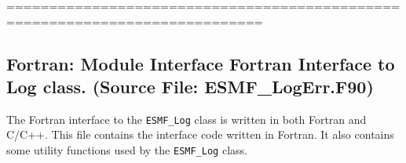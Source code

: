  
\setlength{\parskip}{0pt}
\setlength{\parindent}{0pt}
\setlength{\baselineskip}{11pt}
 
\def\bv{\begin{verbatim}}
\def\ev{\end{verbatim}}
\def\be{\begin{equation}}
\def\ee{\end{equation}}
\def\bea{\begin{eqnarray}}
\def\eea{\end{eqnarray}}
\def\bi{\begin{itemize}}
\def\ei{\end{itemize}}
\def\bn{\begin{enumerate}}
\def\en{\end{enumerate}}
\def\bd{\begin{description}}
\def\ed{\end{description}}
\def\({\left (}
\def\){\right )}
\def\[{\left [}
\def\]{\right ]}
\def\<{\left  \langle}
\def\>{\right \rangle}
\def\cI{{\cal I}}
\def\diag{\mathop{\rm diag}}
\def\tr{\mathop{\rm tr}}


 

  ============================================================================\subsection{Fortran:  Module Interface Fortran Interface to Log class.  (Source File: ESMF\_LogErr.F90)}


  
  
   The Fortran interface to the {\tt ESMF\_Log} class is written in both
   Fortran and C/C++.
   This file contains the interface code written in Fortran.  It also contains
   some utility functions used by the {\tt ESMF\_Log} class.
   
 
